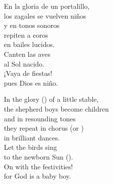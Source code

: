 \begin{poemtranslation}
\begin{original}
En la gloria de un portalillo, \\
los zagales se vuelven niños \\
y en tonos sonoros \\
repiten a coros \\
en bailes lucidos. \\
Canten las aves \\
al Sol nacido. \\
¡Vaya de fiestas! \\
pues Dios es niño.
\end{original}
\begin{translation}
In the glory () of a little stable, \\
the shepherd boys become children \\
and in resounding tones \\
they repeat in chorus (or ) \\
in brilliant dances. \\
Let the birds sing \\
to the newborn Sun (). \\
On with the festivities! \\
for God is a baby boy.
\end{translation}
\end{poemtranslation}